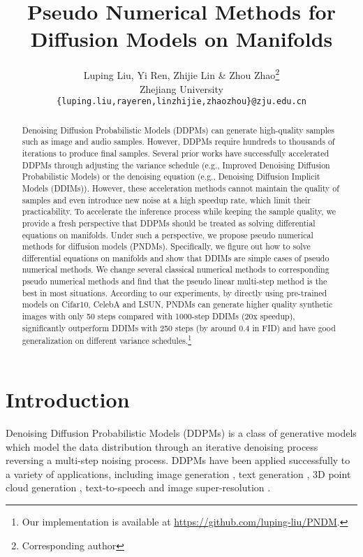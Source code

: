 \documentclass{article}
\title{Pseudo Numerical Methods for Diffusion Models on Manifolds}
\author{Luping Liu, Yi Ren, Zhijie Lin \& Zhou Zhao\thanks{Corresponding author} \\
Zhejiang University \\
\texttt{\{luping.liu,rayeren,linzhijie,zhaozhou\}@zju.edu.cn} \\
}
\begin{document}
\maketitle

\begin{abstract}
   Denoising Diffusion Probabilistic Models (DDPMs) can generate high-quality samples such as image and audio samples. However, DDPMs require hundreds to thousands of iterations to produce final samples. Several prior works have successfully accelerated DDPMs through adjusting the variance schedule (e.g., Improved Denoising Diffusion Probabilistic Models) or the denoising equation (e.g., Denoising Diffusion Implicit Models (DDIMs)). However, these acceleration methods cannot maintain the quality of samples and even introduce new noise at a high speedup rate, which limit their practicability. To accelerate the inference process while keeping the sample quality, we provide a fresh perspective that DDPMs should be treated as solving differential equations on manifolds. Under such a perspective, we propose pseudo numerical methods for diffusion models (PNDMs). Specifically, we figure out how to solve differential equations on manifolds and show that DDIMs are simple cases of pseudo numerical methods. We change several classical numerical methods to corresponding pseudo numerical methods and find that the pseudo linear multi-step method is the best in most situations.
   According to our experiments, by directly using pre-trained models on Cifar10, CelebA and LSUN, PNDMs can generate higher quality synthetic images with only 50 steps compared with 1000-step DDIMs (20x speedup), significantly outperform DDIMs with 250 steps (by around 0.4 in FID) and have good generalization on different variance schedules.\footnote{Our implementation is available at \url{https://github.com/luping-liu/PNDM}.}
\end{abstract}

\section{Introduction}

Denoising Diffusion Probabilistic Models (DDPMs) \citep{sohl-dickstein2015, Ho2020} is a class of generative models which model the data distribution through an iterative denoising process reversing a multi-step noising process. DDPMs have been applied successfully to a variety of applications, including image generation \citep{Ho2020,Song2020}, text generation \citep{Hoogeboom2021, Austin2021}, 3D point cloud generation \citep{Luo2021}, text-to-speech \citep{kong2021a, chen2020} and image super-resolution \citep{saharia2021}.
\end{document}
